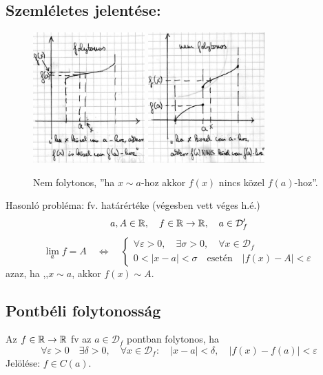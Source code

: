 \documentclass[a4paper,11.5pt]{article}
\begin{document}
	\subsection{Szemléletes jelentése:}
		\begin{figure}[!h]
			\centering
			\includegraphics[height=5cm]{kepek/1_abra_folytonos.jpg}\quad \quad 
			\includegraphics[height=5cm]{kepek/1_abra_nemfolytonos.jpg}
			\caption{Nem folytonos, ''ha $x\sim a$-hoz akkor $f(x)$ nincs közel $f(a)$-hoz''.}\label{fig_nemfolytonos}
		\end{figure}
		
		\begin{note}
			Hasonló probléma: fv. határértéke (végesben vett véges h.é.)
			\[a, A\in \mathbb{R},\quad f\in\mathbb{R}\to\mathbb{R},\quad a\in\mathcal{D}'_f \]
			\[\displaystyle\lim_af=A \quad \Leftrightarrow \quad 
			\left\{
			\begin{gathered}
			\forall \varepsilon >0,\quad  \exists \sigma>0,\quad  \forall x \in \mathcal{D}_f \\
			0<|x-a|<\sigma \quad \text{esetén} \quad|f(x)-A| < \varepsilon
			\end{gathered}\right. \]
			azaz, ha ,,$x\sim a$, akkor $f(x) \sim A$.
		\end{note}
		
	\subsection{\textbf{Pontbéli folytonosság}}
		\begin{definition}
			Az $f\in \mathbb{R}\to\mathbb{R}$ fv az $a\in\mathcal{D}_f$ pontban folytonos, ha
			\[ \forall \varepsilon>0 \quad \exists \delta>0, \quad \forall x \in \mathcal{D}_f:\quad  |x-a|<\delta, \quad |f(x)-f(a)|<\varepsilon \]
			Jelölése: $f\in C(a)$.
		\end{definition}
		
\end{document}
